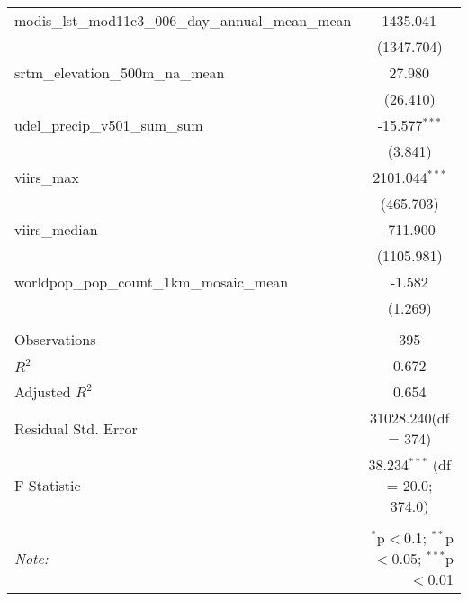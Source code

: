 \begin{table}[!htbp]
\begin{tabular}{@{\extracolsep{5pt}}lc}
 modis_lst_mod11c3_006_day_annual_mean_mean & 1435.041$^{}$ \\
  & (1347.704) \\
 srtm_elevation_500m_na_mean & 27.980$^{}$ \\
  & (26.410) \\
 udel_precip_v501_sum_sum & -15.577$^{***}$ \\
  & (3.841) \\
 viirs_max & 2101.044$^{***}$ \\
  & (465.703) \\
 viirs_median & -711.900$^{}$ \\
  & (1105.981) \\
 worldpop_pop_count_1km_mosaic_mean & -1.582$^{}$ \\
  & (1.269) \\
\hline \\[-1.8ex]
 Observations & 395 \\
 $R^2$ & 0.672 \\
 Adjusted $R^2$ & 0.654 \\
 Residual Std. Error & 31028.240(df = 374)  \\
 F Statistic & 38.234$^{***}$ (df = 20.0; 374.0) \\
\hline
\hline \\[-1.8ex]
\textit{Note:} & \multicolumn{1}{r}{$^{*}$p$<$0.1; $^{**}$p$<$0.05; $^{***}$p$<$0.01} \\
\end{tabular}
\end{table}